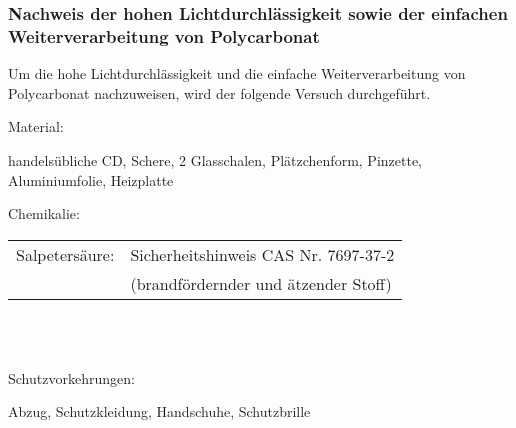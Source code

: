 \subsubsection{Nachweis der hohen Lichtdurchlässigkeit sowie der einfachen Weiterverarbeitung von Polycarbonat}

Um die hohe Lichtdurchlässigkeit und die einfache Weiterverarbeitung von
Polycarbonat nachzuweisen, wird der folgende Versuch durchgeführt.\\

\par

Material:
\begin{compactitem}
    \item handelsübliche CD, Schere, 2 Glasschalen, Plätzchenform, Pinzette, Aluminium\-folie, Heizplatte
    \item Chemikalie: \\[5pt]
    \begin{tabular}{ll}
    Salpetersäure: & Sicherheitshinweis CAS Nr. 7697-37-2 \\
    & (brandfördernder und ätzender Stoff) \\
    \end{tabular}
\end{compactitem}~\par

\\Schutzvorkehrungen:
\begin{compactitem}
    \item Abzug, Schutzkleidung, Handschuhe, Schutzbrille
\end{compactitem}~\par


